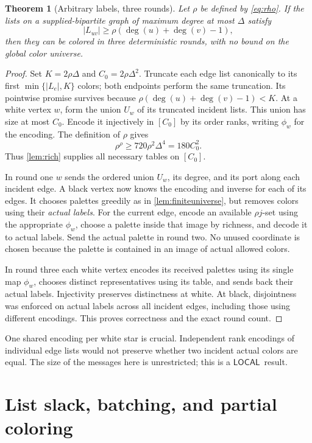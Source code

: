 \documentclass[11pt]{article}
\newtheorem{theorem}{Theorem}[section]
\theoremstyle{definition}
\theoremstyle{remark}
\newcommand{\abs}[1]{\left|#1\right|}
\newcommand{\LOCAL}{\ensuremath{\mathsf{LOCAL}}}
\begin{document}
\begin{theorem}[Arbitrary labels, three rounds]\label{thm:listprimitive}
Let $\rho$ be defined by \eqref{eq:rho}. If the lists on a
supplied-bipartite graph of maximum degree at most $\Delta$ satisfy
\[
 \abs{L_{uv}}\ge\rho(\deg(u)+\deg(v)-1),
\]
then they can be colored in three deterministic rounds, with no bound
on the global color universe.
\end{theorem}
\begin{proof}
Set $K=2\rho\Delta$ and $C_0=2\rho\Delta^2$. Truncate each edge list
canonically to its first $\min\{\abs{L_e},K\}$ colors; both endpoints
perform the same truncation. Its pointwise promise survives because
$\rho(\deg(u)+\deg(v)-1)<K$.
At a white vertex $w$, form the union $U_w$ of its truncated incident
lists. This union has size at most $C_0$. Encode it injectively in
$[C_0]$ by its order ranks, writing $\phi_w$ for the encoding.
The definition of $\rho$ gives
\[
 \rho^\rho\ge720\rho^2\Delta^4=180C_0^2.
\]
Thus \cref{lem:rich} supplies all necessary tables on $[C_0]$.

In round one $w$ sends the ordered union $U_w$, its degree, and its
port along each incident edge. A black vertex now knows the encoding
and inverse for each of its edges. It chooses palettes greedily as in
\cref{lem:finiteuniverse}, but removes colors using their \emph{actual
labels}. For the current edge, encode an available $\rho j$-set using
the appropriate $\phi_w$, choose a palette inside that image by
richness, and decode it to actual labels. Send the actual palette in
round two. No unused coordinate is chosen because the palette is
contained in an image of actual allowed colors.

In round three each white vertex encodes its received palettes using
its single map $\phi_w$, chooses distinct representatives using its
table, and sends back their actual labels. Injectivity preserves
distinctness at white. At black, disjointness was enforced on actual
labels across all incident edges, including those using different
encodings. This proves correctness and the exact round count.
\end{proof}

One shared encoding per white star is crucial. Independent rank
encodings of individual edge lists would not preserve whether two
incident actual colors are equal. The size of the messages here is
unrestricted; this is a \LOCAL\ result.

\section{List slack, batching, and partial coloring}\label{sec:slack}
\end{document}
